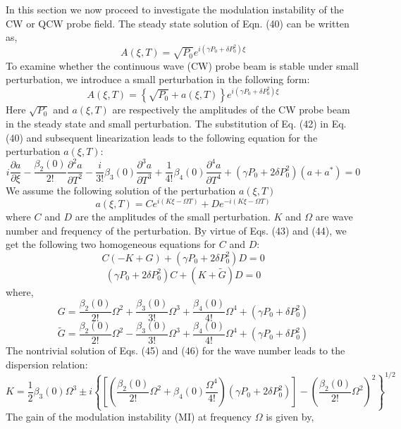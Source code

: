 \documentclass[12pt,a4paper]{article}
\begin{document}
In this section we now proceed to investigate the modulation instability of the CW or QCW probe field. The steady state solution of Eqn. (40) can be written as,
\begin{equation}
A(\xi, T) = \sqrt{P_0} e^{i (\gamma P_0 + \delta P_0^2) \xi}
\end{equation}
To examine whether the continuous wave (CW) probe beam is stable under small perturbation, we introduce a small perturbation in the following form:
\begin{equation}
A(\xi, T) = \left\{ \sqrt{P_0} + a(\xi, T) \right\} e^{i (\gamma P_0 + \delta P_0^2) \xi}
\end{equation}
Here \( \sqrt{P_0} \) and \( a(\xi, T) \) are respectively the amplitudes of the CW probe beam in the steady state and small perturbation. The substitution of Eq. (42) in Eq. (40) and subsequent linearization leads to the following equation for the perturbation \( a(\xi, T) \):
\begin{equation}
i \frac{\partial a}{\partial \xi} - \frac{\beta_2(0)}{2!} \frac{\partial^2 a}{\partial T^2} - \frac{i}{3!} \beta_3(0) \frac{\partial^3 a}{\partial T^3} + \frac{1}{4!} \beta_4(0) \frac{\partial^4 a}{\partial T^4} + (\gamma P_0 + 2 \delta P_0^2)(a + a^*) = 0
\end{equation}
We assume the following solution of the perturbation \( a(\xi, T) \)
\begin{equation}
a(\xi, T) = C e^{i(K \xi - \Omega T)} + D e^{-i(K \xi - \Omega T)}
\end{equation}
where \( C \) and \( D \) are the amplitudes of the small perturbation. \( K \) and \( \Omega \) are wave number and frequency of the perturbation. By virtue of Eqs. (43) and (44), we get the following two homogeneous equations for \( C \) and \( D \):
\begin{equation}
C(-K + G) + (\gamma P_0 + 2 \delta P_0^2) D = 0
\end{equation}
\begin{equation}
(\gamma P_0 + 2 \delta P_0^2) C + (K + \tilde{G}) D = 0
\end{equation}
where,
\[
G = \frac{\beta_2(0)}{2!} \Omega^2 + \frac{\beta_3(0)}{3!} \Omega^3 + \frac{\beta_4(0)}{4!} \Omega^4 + (\gamma P_0 + \delta P_0^2)
\]
\[
\tilde{G} = \frac{\beta_2(0)}{2!} \Omega^2 - \frac{\beta_3(0)}{3!} \Omega^3 + \frac{\beta_4(0)}{4!} \Omega^4 + (\gamma P_0 + \delta P_0^2)
\]
The nontrivial solution of Eqs. (45) and (46) for the wave number leads to the dispersion relation:
\begin{equation}
K = \frac{1}{2} \beta_3(0) \Omega^3 \pm i \left\{ \left[ \left( \frac{\beta_2(0)}{2!} \Omega^2 + \beta_4(0) \frac{\Omega^4}{4!} \right) \left( \gamma P_0 + 2 \delta P_0^2 \right) \right] - \left( \frac{\beta_2(0)}{2!} \Omega^2 \right)^2 \right\}^{1/2}
\end{equation}
The gain of the modulation instability (MI) at frequency \( \Omega \) is given by,
\end{document}
